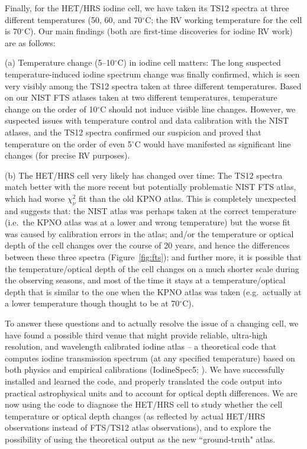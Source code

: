 \documentclass[12pt]{article}
\def\degree{^{\circ}}
\begin{document}
Finally, for the HET/HRS iodine cell, we have taken its TS12 spectra
at three different temperatures (50, 60, and 70$\degree$C; the RV
working temperature for the cell is 70$\degree$C). Our main findings
(both are first-time discoveries for iodine RV work) are as follows:

(a) Temperature change (5--10$\degree$C) in iodine cell matters: The
long suspected temperature-induced iodine spectrum change was finally
confirmed, which is seen very visibly among the TS12 spectra taken at
three different temperatures. Based on our NIST FTS atlases taken at
two different temperatures, temperature change on the order of
10$\degree$C should not induce visible line changes. However, we
suspected issues with temperature control and data calibration with
the NIST atlases, and the TS12 spectra confirmed our suspicion and
proved that temperature on the order of even 5$\degree$C would have
manifested as significant line changes (for precise RV purposes).

(b) The HET/HRS cell very likely has changed over time: The TS12
spectra match better with the more recent but potentially problematic
NIST FTS atlas, which had worse $\chi^2_\nu$ fit than the old KPNO
atlas. This is completely unexpected and suggests that: the NIST atlas
was perhaps taken at the correct temperature (i.e.\ the KPNO atlas was
at a lower and wrong temperature) but the worse fit was caused by
calibration errors in the atlas; and/or the temperature or optical
depth of the cell changes over the course of 20 years, and hence the
differences between these three spectra (Figure~\ref{fig:fts}); and
further more, it is possible that the temperature/optical depth of the
cell changes on a much shorter scale during the observing seasons, and
most of the time it stays at a temperature/optical depth that is
similar to the one when the KPNO atlas was taken (e.g.\ actually at a
lower temperature though thought to be at 70$\degree$C).

To answer these questions and to actually resolve the issue of a
changing cell, we have found a possible third venue that might provide
reliable, ultra-high resolution, and wavelength calibrated iodine
atlas -- a theoretical code that computes iodine transmission spectrum
(at any specified temperature) based on both physics and empirical
calibrations (IodineSpec5; \citealt{iodinespec5}). We have
successfully installed and learned the code, and properly translated
the code output into practical astrophysical units and to account for
optical depth differences. We are now using the code to diagnose the
HET/HRS cell to study whether the cell temperature or optical depth
changes (as reflected by actual HET/HRS observations instead of
FTS/TS12 atlas observations), and to explore the possibility of using
the theoretical output as the new ``ground-truth" atlas.
\end{document}

